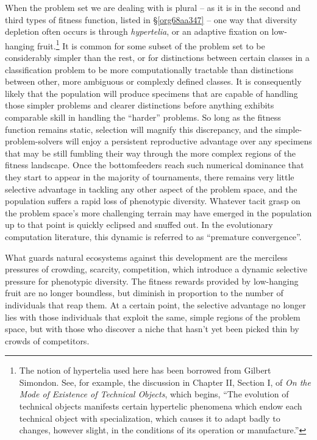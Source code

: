 \documentclass[12pt,glossary]{dalthesis}
\begin{document}
When the problem set we are dealing with is plural -- as it is in the second and third types
of fitness function, listed in \S \ref{org68aa347} -- one way that diversity depletion often
occurs is through \emph{hypertelia}, or an adaptive fixation on low-hanging fruit.\footnote{The notion of hypertelia used here has been borrowed from Gilbert Simondon. See,
  for example, the discussion in Chapter II, Section I, of 
  \emph{On the Mode of Existence of Technical Objects}, which begins, ``The evolution of technical objects manifests certain hypertelic phenomena which
  endow each technical object with specialization, which causes it to adapt badly
  to changes, however slight, in the conditions of its operation or manufacture.''} 
It is common for some subset of the problem set to be considerably simpler than the rest,
or for distinctions between certain classes in a classification problem to be more computationally
tractable than distinctions between other, more ambiguous or complexly defined classes. 
It is consequently likely that the population will produce specimens that are capable of
handling those simpler problems and clearer distinctions before anything exhibits comparable
skill in handling the ``harder'' problems. So long as the fitness function remains static,
selection will magnify this discrepancy, and the simple-problem-solvers will enjoy a persistent
reproductive advantage over any specimens that may be still fumbling their way through the
more complex regions of the fitness landscape. Once the bottomfeeders reach such numerical
dominance that they start to appear in the majority of tournaments, there remains very little
selective advantage in tackling any other aspect of the problem space, and the population
suffers a rapid loss of phenotypic diversity. Whatever tacit grasp on the problem
space's more challenging terrain may have emerged in the population up to that point is
quickly eclipsed and snuffed out. In the evolutionary computation literature, this dynamic
is referred to as ``premature convergence''. 

What guards natural ecosystems against this development are the merciless
pressures of crowding, scarcity, competition, which introduce a dynamic selective
pressure for phenotypic diversity. The fitness rewards provided by low-hanging
fruit are no longer boundless, but diminish in proportion to the number of
individuals that reap them. At a certain point, the selective advantage no longer
lies with those individuals that exploit the same, simple regions of the problem
space, but with those who discover a niche that hasn't yet been picked thin by
crowds of competitors.
\end{document}
